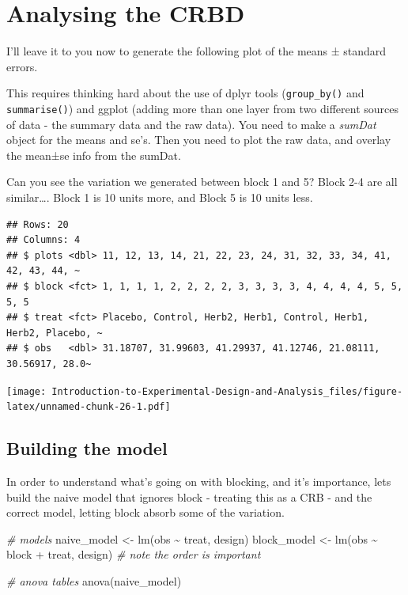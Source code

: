 \documentclass[
]{book}
\newenvironment{Shaded}{\begin{snugshade}}{\end{snugshade}}
\newcommand{\CommentTok}[1]{\textcolor[rgb]{0.56,0.35,0.01}{\textit{#1}}}
\newcommand{\FunctionTok}[1]{\textcolor[rgb]{0.00,0.00,0.00}{#1}}
\newcommand{\NormalTok}[1]{#1}
\newcommand{\OtherTok}[1]{\textcolor[rgb]{0.56,0.35,0.01}{#1}}
\newcommand{\SpecialCharTok}[1]{\textcolor[rgb]{0.00,0.00,0.00}{#1}}
\begin{document}
\hypertarget{analysing-the-crbd}{%
\section{Analysing the CRBD}\label{analysing-the-crbd}}

I'll leave it to you now to generate the following plot of the means ± standard errors.

This requires thinking hard about the use of dplyr tools (\texttt{group\_by()} and \texttt{summarise()}) and ggplot (adding more than one layer from two different sources of data - the summary data and the raw data). You need to make a \emph{sumDat} object for the means and se's. Then you need to plot the raw data, and overlay the mean±se info from the sumDat.

Can you see the variation we generated between block 1 and 5? Block 2-4 are all similar\ldots. Block 1 is 10 units more, and Block 5 is 10 units less.

\begin{verbatim}
## Rows: 20
## Columns: 4
## $ plots <dbl> 11, 12, 13, 14, 21, 22, 23, 24, 31, 32, 33, 34, 41, 42, 43, 44, ~
## $ block <fct> 1, 1, 1, 1, 2, 2, 2, 2, 3, 3, 3, 3, 4, 4, 4, 4, 5, 5, 5, 5
## $ treat <fct> Placebo, Control, Herb2, Herb1, Control, Herb1, Herb2, Placebo, ~
## $ obs   <dbl> 31.18707, 31.99603, 41.29937, 41.12746, 21.08111, 30.56917, 28.0~
\end{verbatim}

\texttt{[image: Introduction-to-Experimental-Design-and-Analysis\_files/figure-latex/unnamed-chunk-26-1.pdf]}

\hypertarget{building-the-model}{%
\subsection{Building the model}\label{building-the-model}}

In order to understand what's going on with blocking, and it's importance, lets build the naive model that ignores block - treating this as a CRB - and the correct model, letting block absorb some of the variation.

\begin{Shaded}
\begin{Highlighting}[]
\CommentTok{\# models}
\NormalTok{naive\_model }\OtherTok{\textless{}{-}} \FunctionTok{lm}\NormalTok{(obs }\SpecialCharTok{\textasciitilde{}}\NormalTok{ treat, design)}
\NormalTok{block\_model }\OtherTok{\textless{}{-}} \FunctionTok{lm}\NormalTok{(obs }\SpecialCharTok{\textasciitilde{}}\NormalTok{ block }\SpecialCharTok{+}\NormalTok{ treat, design) }\CommentTok{\# note the order is important}

\CommentTok{\# anova tables}
\FunctionTok{anova}\NormalTok{(naive\_model)}
\end{Highlighting}
\end{Shaded}
\end{document}
